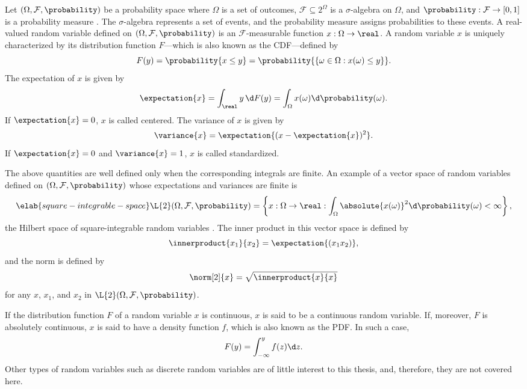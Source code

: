 Let $(\Omega, \mathcal{F}, \probability)$ be a probability space where $\Omega$
is a set of outcomes, $\mathcal{F} \subseteq 2^\Omega$ is a $\sigma$-algebra on
$\Omega$, and $\probability: \mathcal{F} \to [0, 1]$ is a probability measure
\cite{durrett2010}. The $\sigma$-algebra represents a set of events, and the
probability measure assigns probabilities to these events. A real-valued random
variable defined on $(\Omega, \mathcal{F}, \probability)$ is an
$\mathcal{F}$-measurable function $x: \Omega \to \real$. A random variable $x$
is uniquely characterized by its distribution function $F$---which is also known
as the \acf{CDF}---defined by
\begin{equation*}
  F(y) = \probability{x \leq y} = \probability{\{ \omega \in \Omega: x(\omega) \leq y \}}.
\end{equation*}
The expectation of $x$ is given by
\[
  \expectation{x} = \int_\real y \, \d F(y) = \int_\Omega x(\omega) \d \probability(\omega).
\]
If $\expectation{x} = 0$, $x$ is called centered. The variance of $x$ is given
by
\[
  \variance{x} = \expectation{(x - \expectation{x})^2}.
\]
If $\expectation{x} = 0$ and $\variance{x} = 1$, $x$ is called standardized.

The above quantities are well defined only when the corresponding integrals are
finite. An example of a vector space of random variables defined on $(\Omega,
\mathcal{F}, \probability)$ whose expectations and variances are finite is
\begin{equation} \elab{square-integrable-space}
  \L{2}(\Omega, \mathcal{F}, \probability) = \left\{ x: \Omega \to \real: \int_\Omega \absolute{x(\omega)}^2 \d \probability(\omega) < \infty \right\},
\end{equation}
the Hilbert space of square-integrable random variables \cite{janson1997}. The
inner product in this vector space is defined by
\[
  \innerproduct{x_1}{x_2} = \expectation{(x_1 x_2)},
\]
and the norm is defined by
\[
  \norm[2]{x} = \sqrt{\innerproduct{x}{x}}
\]
for any $x$, $x_1$, and $x_2$ in $\L{2}(\Omega, \mathcal{F}, \probability)$.

If the distribution function $F$ of a random variable $x$ is continuous, $x$ is
said to be a continuous random variable. If, moreover, $F$ is absolutely
continuous, $x$ is said to have a density function $f$, which is also known as
the \acf{PDF}. In such a case,
\[
  F(y) = \int_{-\infty}^y f(z) \d z.
\]
Other types of random variables such as discrete random variables are of little
interest to this thesis, and, therefore, they are not covered here.

